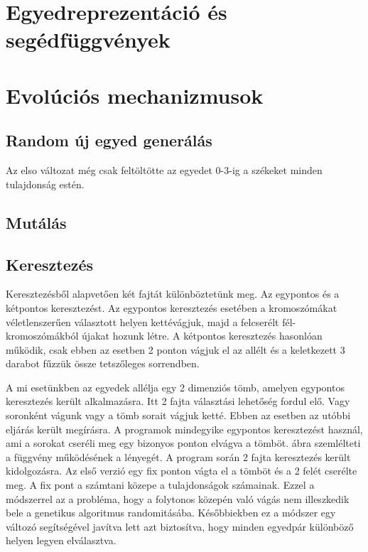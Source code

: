 \documentclass[12ppt,a4paper,oneside]{report}
\begin{document}
    \section{Egyedreprezentáció és segédfüggvények} %

    \section{Evolúciós mechanizmusok} %
        
        \subsection{Random új egyed generálás} %
        
        
         {Az elso változat még csak feltöltötte az egyedet 0-3-ig a székeket minden tulajdonság estén.}
            
        \subsection{Mutálás} %
            
        \subsection{Keresztezés} %
            
            {Keresztezésből alapvetően két fajtát különböztetünk meg. Az egypontos és a kétpontos keresztezést. Az egypontos keresztezés esetében a kromoszómákat véletlenszerűen választott helyen kettévágjuk, majd a felcserélt fél-kromoszómákból újakat hozunk létre.  A kétpontos keresztezés hasonlóan működik, csak ebben az esetben 2 ponton vágjuk el az allélt és a keletkezett 3 darabot fűzzük össze tetszőleges sorrendben.}
                        
            {A mi esetünkben az egyedek allélja egy 2 dimenziós tömb, amelyen egypontos keresztezés került alkalmazásra. Itt 2 fajta választási lehetőség fordul elő. Vagy soronként vágunk vagy a tömb sorait vágjuk ketté. Ebben az esetben az utóbbi eljárás került megírásra. A programok mindegyike egypontos keresztezést használ, ami a sorokat cseréli meg egy bizonyos ponton elvágva a tömböt.  ábra szemlélteti a függvény működésének a lényegét. A program során 2 fajta keresztezés került kidolgozásra. Az első verzió egy fix ponton vágta el a tömböt és a 2 felét cserélte meg. A fix pont a számtani közepe a tulajdonságok számainak. Ezzel a módszerrel az a probléma, hogy a folytonos közepén való vágás nem illeszkedik bele a genetikus algoritmus randomitásába. Későbbiekben ez a módszer egy változó segítségével javítva lett azt biztosítva, hogy minden egyedpár különböző helyen legyen elválasztva.}
            
\end{document}
